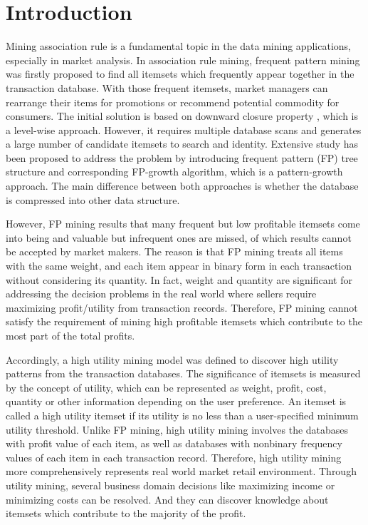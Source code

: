 \documentclass[runningheads,a4paper]{llncs}
\begin{document}
\section{Introduction}
Mining association rule \cite{Agrawal:basic,Agrawal:fast} is a fundamental topic in the data mining applications, especially in market analysis. In association rule mining, frequent pattern mining was firstly proposed to find all itemsets which frequently appear together in the transaction database. With those frequent itemsets, market managers can rearrange their items for promotions or recommend potential commodity for consumers. The initial solution is based on downward closure property , which is a level-wise approach. However, it requires multiple database scans and generates a large number of candidate itemsets to search and identity. Extensive study \cite{Han:FIMwithoutcand} has been proposed to address the problem by introducing frequent pattern (FP) tree structure and corresponding FP-growth algorithm, which is a pattern-growth approach. The main difference between both approaches is whether the database is compressed into other data structure.

However, FP mining results that many frequent but low profitable itemsets come into being and valuable but infrequent ones are missed, of which results cannot be accepted by market makers. The reason is that FP mining treats all items with the same weight, and each item appear in binary form in each transaction without considering its quantity. In fact, weight and quantity are significant for addressing the decision problems in the real world where sellers require maximizing profit/utility from transaction records. Therefore, FP mining cannot satisfy the requirement of mining high profitable itemsets which contribute to the most part of the total profits.

Accordingly, a high utility mining model \cite{Liu:two-phasewithCCPD,Liu:two-phase} was defined to discover high utility patterns from the transaction databases. The significance of itemsets is measured by the concept of utility, which can be represented as weight, profit, cost, quantity or other information depending on the user preference. An itemset is called a high utility itemset if its utility is no less than a user-specified minimum utility threshold. Unlike FP mining, high utility mining involves the databases with profit value of each item, as well as databases with nonbinary frequency values of each item in each transaction record. Therefore, high utility mining more comprehensively represents real world market retail environment. Through utility mining, several business domain decisions like maximizing income or minimizing costs can be resolved. And they can discover knowledge about itemsets which contribute to the majority of the profit.
\end{document}
